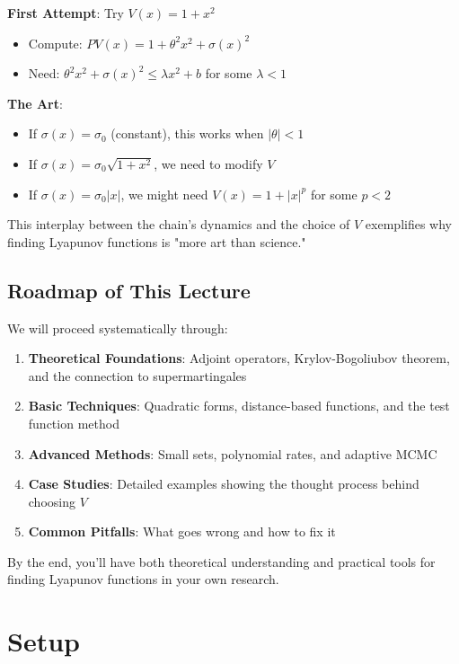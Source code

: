 \documentclass{amsart}
\theoremstyle{plain}
\theoremstyle{definition}
\theoremstyle{remark}
\begin{document}
\textbf{First Attempt}: Try $V(x) = 1 + x^2$

\begin{itemize}
	\item Compute: $PV(x) = 1 + \theta^2 x^2 + \sigma(x)^2$
	\item Need: $\theta^2 x^2 + \sigma(x)^2 \leq \lambda x^2 + b$ for some $\lambda < 1$
\end{itemize}

\textbf{The Art}:

\begin{itemize}
	\item If $\sigma(x) = \sigma_0$ (constant), this works when $|\theta| < 1$
	\item If $\sigma(x) = \sigma_0 \sqrt{1 + x^2}$, we need to modify $V$
	\item If $\sigma(x) = \sigma_0 |x|$, we might need $V(x) = 1 + |x|^p$ for some $p < 2$
\end{itemize}

This interplay between the chain's dynamics and the choice of $V$ exemplifies why finding Lyapunov functions is "more art than science."

\subsection{Roadmap of This Lecture}

We will proceed systematically through:

\begin{enumerate}
	\item \textbf{Theoretical Foundations}: Adjoint operators, Krylov-Bogoliubov theorem, and the connection to supermartingales
	\item \textbf{Basic Techniques}: Quadratic forms, distance-based functions, and the test function method
	\item \textbf{Advanced Methods}: Small sets, polynomial rates, and adaptive MCMC
	\item \textbf{Case Studies}: Detailed examples showing the thought process behind choosing $V$
	\item \textbf{Common Pitfalls}: What goes wrong and how to fix it
\end{enumerate}

By the end, you'll have both theoretical understanding and practical tools for finding Lyapunov functions in your own research.

\section{Setup}
\end{document}
